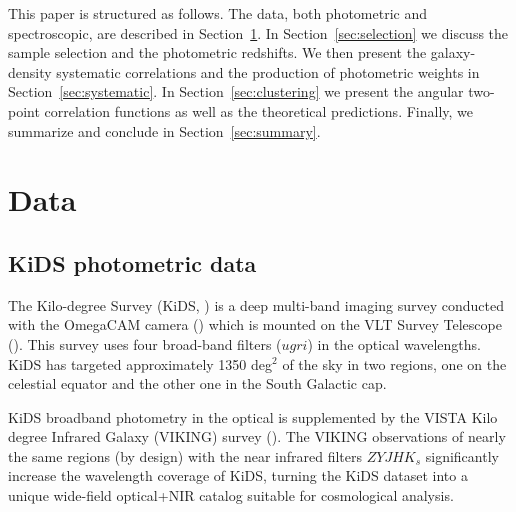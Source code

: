 \documentclass{aa}
\numberwithin{equation}{section}
\begin{document}
This paper is structured as follows. The data, both photometric and spectroscopic, are described in Section~\ref{sec:data}. In Section~\ref{sec:selection} we discuss the sample selection and the photometric redshifts. We then present the galaxy-density systematic correlations and the production of photometric weights in Section~\ref{sec:systematic}. In Section~\ref{sec:clustering} we present the angular two-point correlation functions as well as the theoretical predictions. Finally, we summarize and conclude in Section~\ref{sec:summary}. 

\section{Data}\label{sec:data}

\subsection{KiDS photometric data}\label{sec:kids}

The Kilo-degree Survey (KiDS, \citealt{kids}) is a deep multi-band imaging survey conducted with the OmegaCAM camera (\citealt{omegacam}) which is mounted on the VLT Survey Telescope (\citealt{vst}). This survey uses four broad-band filters ($ugri$) in the optical wavelengths. KiDS has targeted approximately 1350 deg$^2$ of the sky in two regions, one on the celestial equator and the other one in the South Galactic cap. 

KiDS broadband photometry in the optical is supplemented by the VISTA Kilo degree Infrared Galaxy (VIKING) survey (\citealt{irwin2004,lewis2010,Edge2013,Gonz2018}). The VIKING observations of nearly the same regions (by design) with the near infrared filters $ZYJHK_{s}$ significantly increase the wavelength coverage of KiDS, turning the KiDS dataset into a unique wide-field optical+NIR catalog suitable for cosmological analysis.
\end{document}
